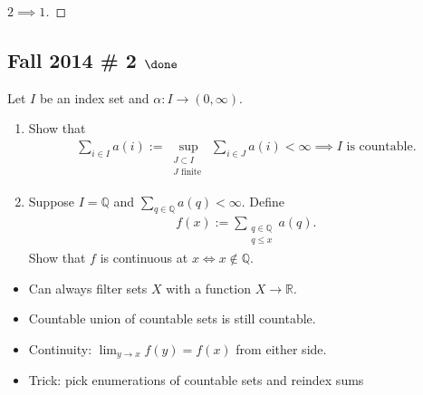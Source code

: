 \begin{solution}
\begin{proof}[$2\implies 1$]
\end{proof}

\end{solution}

\hypertarget{fall-2014-2-done}{%
\subsection{\texorpdfstring{Fall 2014 \# 2
\(\done\)}{Fall 2014 \# 2 \textbackslash done}}\label{fall-2014-2-done}}

Let \(I\) be an index set and \(\alpha: I \to (0, \infty)\).

\begin{enumerate}
\def\labelenumi{\alph{enumi}.}
\item
  Show that
  \begin{align*}
  \sum_{i \in I} a(i):=\sup _{\substack{ J \subset I \\ J \text { finite }}} \sum_{i \in J} a(i)<\infty \implies I \text{ is countable.}
  \end{align*}
\item
  Suppose \(I = {\mathbb{Q}}\) and
  \(\sum_{q \in \mathbb{Q}} a(q)<\infty\). Define
  \begin{align*}
  f(x):=\sum_{\substack{q \in \mathbb{Q}\\ q \leq x}} a(q).
  \end{align*}
  Show that \(f\) is continuous at \(x \iff x\not\in {\mathbb{Q}}\).
\end{enumerate}

\begin{concept}

\envlist

\begin{itemize}
\tightlist
\item
  Can always filter sets \(X\) with a function \(X\to {\mathbb{R}}\).
\item
  Countable union of countable sets is still countable.
\item
  Continuity: \(\lim_{y\to x} f(y) = f(x)\) from either side.
\item
  Trick: pick enumerations of countable sets and reindex sums
\end{itemize}

\end{concept}

